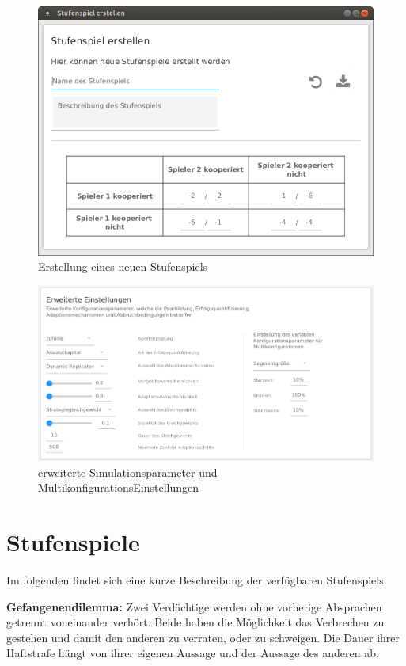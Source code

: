 \documentclass[parskip=full,11pt]{scrartcl}
\begin{document}
\begin{figure}[ht]
	\centering
	\includegraphics[width=\textwidth]{images/game.png}
	\caption{\label{fig:new_game}
		Erstellung eines neuen \Gls{Stufenspiel}s}
\end{figure}


\begin{figure}[hb]
	\centering
	\includegraphics[width=\textwidth]{images/konfig_adv.png}
	\caption{\label{fig:konfig_adv}
		erweiterte Simulationsparameter und MultikonfigurationsEinstellungen}
\end{figure}

\section{Stufenspiele}
Im folgenden findet sich eine kurze Beschreibung der verfügbaren \Glspl{Stufenspiel}.

\textbf{Gefangenendilemma:}
Zwei Verdächtige werden ohne vorherige Absprachen getrennt voneinander verhört. Beide haben die Möglichkeit das Verbrechen zu gestehen und damit den anderen zu verraten, oder zu schweigen. Die Dauer ihrer Haftstrafe hängt von ihrer eigenen Aussage und der Aussage des anderen ab.
\end{document}
